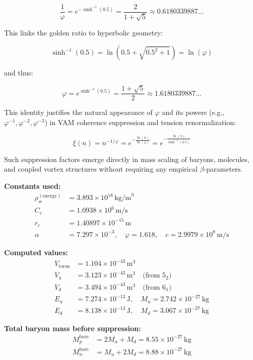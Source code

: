 \documentclass[12pt]{article}
\begin{document}
\[
\boxed{
\frac{1}{\varphi} = e^{-\sinh^{-1}(0.5)} = \frac{2}{1 + \sqrt{5}} \approx 0.6180339887\ldots
}
\]

This links the golden ratio to hyperbolic geometry:

\[
\sinh^{-1}(0.5) = \ln\left( 0.5 + \sqrt{0.5^2 + 1} \right) = \ln(\varphi)
\]

and thus:

\[
\boxed{
\varphi = e^{\sinh^{-1}(0.5)} = \frac{1 + \sqrt{5}}{2} \approx 1.6180339887\ldots
}
\]

This identity justifies the natural appearance of \( \varphi \) and its powers (e.g., \( \varphi^{-1}, \varphi^{-2}, \varphi^{-3} \)) in VAM coherence suppression and tension renormalization:

\[
\boxed{
\xi(n) = n^{-1/\varphi} = e^{-\frac{\ln(n)}{\ln(\varphi)}} = e^{-\frac{\ln(n)}{\sinh^{-1}(0.5)}}
}
\]

Such suppression factors emerge directly in mass scaling of baryons, molecules, and coupled vortex structures without requiring any empirical \( \beta \)-parameters.

\textbf{Constants used:}
\begin{align*}
\rho_\text{\ae}^{(\text{energy})} &= 3.893 \times 10^{18} \, \text{kg/m}^3 \\
C_e &= 1.0938 \times 10^6 \, \text{m/s} \\
r_c &= 1.40897 \times 10^{-15} \, \text{m} \\
\alpha &= 7.297 \times 10^{-3}, \quad \varphi = 1.618, \quad c = 2.9979 \times 10^8 \, \text{m/s}
\end{align*}

\textbf{Computed values:}
\begin{align*}
V_{\text{torus}} &= 1.104 \times 10^{-43} \, \text{m}^3 \\
V_u &= 3.123 \times 10^{-43} \, \text{m}^3 \quad \text{(from } 5_2 \text{)} \\
V_d &= 3.494 \times 10^{-43} \, \text{m}^3 \quad \text{(from } 6_1 \text{)} \\
E_u &= 7.274 \times 10^{-13} \, \text{J}, \quad M_u = 2.742 \times 10^{-27} \, \text{kg} \\
E_d &= 8.138 \times 10^{-13} \, \text{J}, \quad M_d = 3.067 \times 10^{-27} \, \text{kg}
\end{align*}

\textbf{Total baryon mass before suppression:}
\begin{align*}
M_p^{\text{bare}} &= 2M_u + M_d = 8.55 \times 10^{-27} \, \text{kg} \\
M_n^{\text{bare}} &= M_u + 2M_d = 8.88 \times 10^{-27} \, \text{kg}
\end{align*}
\end{document}
